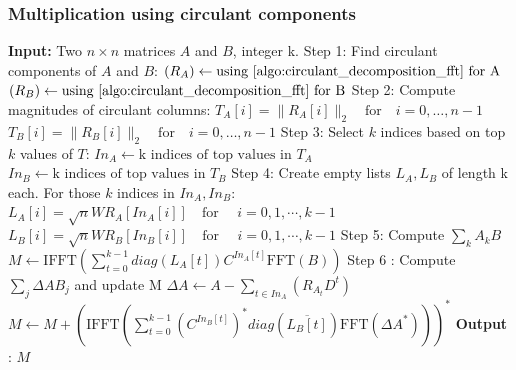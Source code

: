 \documentclass[onefignum,onetabnum]{siamart171218}
\begin{document}
\subsubsection{Multiplication using circulant components}\label{optimal_procedure_to_compute_step_6}
 
\begin{algorithm}
\caption{First-order Approximation of Matrix Multiplication via Circulant Decomposition} \label{algo:cd_matrix_multiplication}
\begin{algorithmic}
\State \textbf{Input:} Two \( n \times n \) matrices \( A \) and \( B \), integer k.
\State Step 1: Find circulant components of \( A \) and \( B \):
\State \hspace{10pt} \( ( R_A) \gets \text{using \ref{algo:circulant_decomposition_fft} for A} \)
\State \hspace{10pt} \( ( R_B) \gets \text{using \ref{algo:circulant_decomposition_fft} for B} \)
\State Step 2: Compute magnitudes of circulant columns:
\State \hspace{10pt} \( T_A[i] = \| R_A[i] \|_2 \quad \text{for} \quad i = 0, \dots, n-1 \)
\State \hspace{10pt} \( T_B[i] = \| R_B[i] \|_2 \quad \text{for} \quad i = 0, \dots, n-1 \)
\State Step 3: Select \( k \) indices based on top $k$ values of $T$:
\State \hspace{10pt} \( In_A \gets \text{k indices of top values in } T_A \)
\State \hspace{10pt} \( In_B \gets \text{k indices of top values in } T_B \)
\State Step 4: Create empty lists $L_A, L_B$ of length k each. For those \(k\) indices in $In_A, In_B$:
\State \hspace{10pt} \( L_A[i]=\sqrt{n}WR_A[In_{A}[i]]  \quad \text{for } \quad i=0,1,\cdots,k-1 \)
\State \hspace{10pt} \( L_B[i]=\sqrt{n}WR_B[In_{B}[i]]  \quad \text{for } \quad i=0,1,\cdots,k-1 \)
\State Step 5: Compute $\sum_{k} A_{k}B$
\State \hspace{10pt} \(M \gets \text{IFFT}\left (\sum_{t =0}^{k-1}diag(L_A[t]) C^{In_A[t]} \text{FFT}(B) \right) \)
\State Step 6 : Compute $\sum_{j} \Delta AB_{j}$ and update M
\State \hspace{10pt} \(\Delta A \gets A - \sum_{t \in In_A} (R_{A_t}D^{t}) \) 
\State \hspace{10pt} \(M \gets M + \left(\text{IFFT}\left( \sum_{t =0}^{k-1} (C^{{{In}_B}[t]})^*diag(\overline{L_B[t]})\text{FFT}(\Delta A^*)\right)\right)^*\)
\State \textbf{Output} : \( M \) 
\end{algorithmic}
\end{algorithm}
\end{document}
